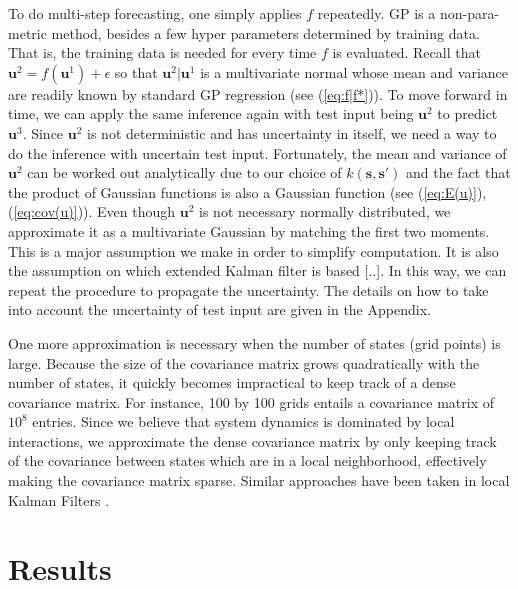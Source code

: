 \documentclass[smallextended,natbib]{svjour3}       %
\begin{document}
To do multi-step forecasting, one simply applies $f$ repeatedly. GP is a non-para-metric method, besides a few hyper parameters determined by training data. That is, the training data is needed for every time $f$ is evaluated. Recall that $\mathbf{u}^{2}=f(\mathbf{u}^{1})+\epsilon$ so that $\mathbf{u}^{2}\vert\mathbf{u}^{1}$ is a multivariate normal whose mean and variance are readily known by standard GP regression (see (\ref{eq:f|f*})). To move forward in time, we can apply the same inference again with test input being $\mathbf{u}^{2}$ to predict $\mathbf{u}^3$. Since $\mathbf{u}^{2}$ is not deterministic and has uncertainty in itself, we need a way to do the inference with uncertain test input. Fortunately, the mean and variance of $\mathbf{u}^{2}$ can be worked out analytically due to our choice of $k(\mathbf{s},\mathbf{s}')$ and the fact that the product of Gaussian functions is also a Gaussian function (see (\ref{eq:E(u)}), (\ref{eq:cov(u)})). Even though $\mathbf{u}^{2}$ is not necessary normally distributed, we approximate it as a multivariate Gaussian by matching the first two moments. This is a major assumption we make in order to simplify computation. It is also the assumption on which extended Kalman filter is based [..]. In this way, we can repeat the procedure to propagate the uncertainty. The details on how to take into account the uncertainty of test input are given in the Appendix. 

One more approximation is necessary when the number of states (grid points) is large. Because the size of the covariance matrix grows quadratically with the number of states, it quickly becomes impractical to keep track of a dense covariance matrix. For instance, 100 by 100 grids entails a covariance matrix of $10^{8}$ entries. Since we believe that system dynamics is dominated by local interactions, we approximate the dense covariance matrix by only keeping track of the covariance between states which are in a local neighborhood, effectively making the covariance matrix sparse. Similar approaches have been taken in local Kalman Filters \citep{Hunt2007}.


\section{Results} \label{sec:syn-data}
\end{document}
